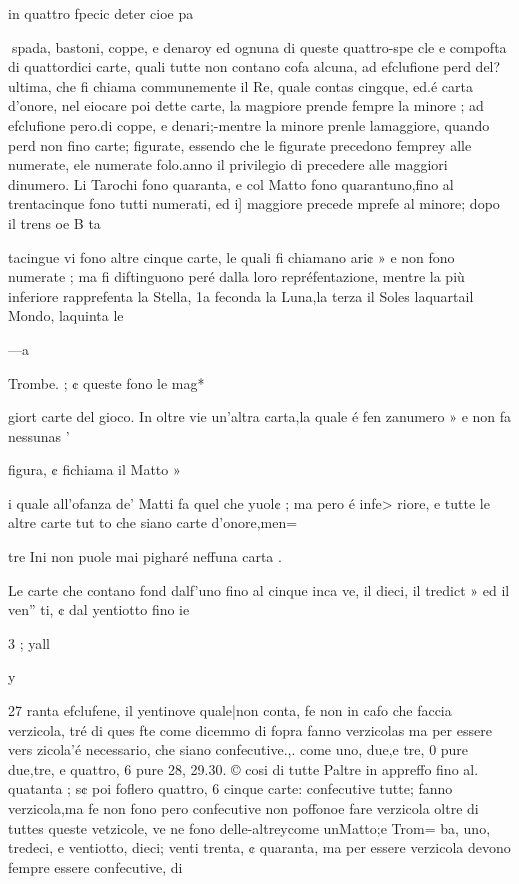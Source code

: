 \documentclass[12pt,a6paper]{article}
\begin{document}
in quattro fpecic deter cioe
pa
 
spada, bastoni, coppe, e denaroy
ed ognuna di queste quattro-spe cle e compofta di quattordici
carte, quali tutte non contano
cofa alcuna, ad efclufione perd
del? ultima, che fi chiama communemente il Re, quale contas
cingque, ed.é carta d’onore, nel
eiocare poi dette carte, la magpiore prende fempre la minore ;
ad efclufione pero.di coppe, e
denari;-mentre la minore prenle lamaggiore, quando perd non
fino carte; figurate, essendo che
le figurate precedono femprey
alle numerate, ele numerate
folo.anno il privilegio di precedere alle maggiori dinumero.
Li Tarochi fono quaranta, e
col Matto fono quarantuno,fino
al trentacinque fono tutti numerati, ed i] maggiore precede
mprefe al minore; dopo il trens
oe B ta 

 

 

 

 

tacingue vi fono altre cinque
carte, le quali fi chiamano ari¢ »
e non fono numerate ; ma fi diftinguono peré dalla loro repréfentazione, mentre la più inferiore rapprefenta la Stella, 1a
feconda la Luna,la terza il Soles
laquartail Mondo, laquinta le

 

—a

Trombe. ; ¢ queste fono le mag*

giort carte del gioco. In oltre
vie un’altra carta,la quale é fen
zanumero » e non fa nessunas '

figura, ¢ fichiama il Matto »

i quale all’ofanza de’ Matti fa
quel che yuol¢ ; ma pero é infe>
riore, e tutte le altre carte tut
to che siano carte d’onore,men=

tre Ini non puole mai pigharé
neffuna carta .

Le carte che contano fond
dalf’uno fino al cinque inca
ve, il dieci, il tredict » ed il ven”
ti, ¢ dal yentiotto fino ie

3 ; yall

y
 

27
ranta efclufene, il yentinove
quale|non conta, fe non in cafo
che faccia verzicola, tré di ques
fte come dicemmo di fopra fanno verzicolas ma per essere vers
zicola’é necessario, che siano
confecutive.,. come uno, due,e
tre, 0 pure due,tre, e quattro, 6
pure 28, 29.30. © cosi di tutte
Paltre in appreffo fino al. quatanta ; s¢ poi foflero quattro, 6
cinque carte: confecutive tutte;
fanno verzicola,ma fe non fono
pero confecutive non poffonoe
fare verzicola oltre di tuttes
queste vetzicole, ve ne fono delle-altreycome unMatto;e Trom=
ba, uno, tredeci, e ventiotto,
dieci; venti trenta, ¢ quaranta,
ma per essere verzicola devono
fempre essere confecutive, di
\end{document}
